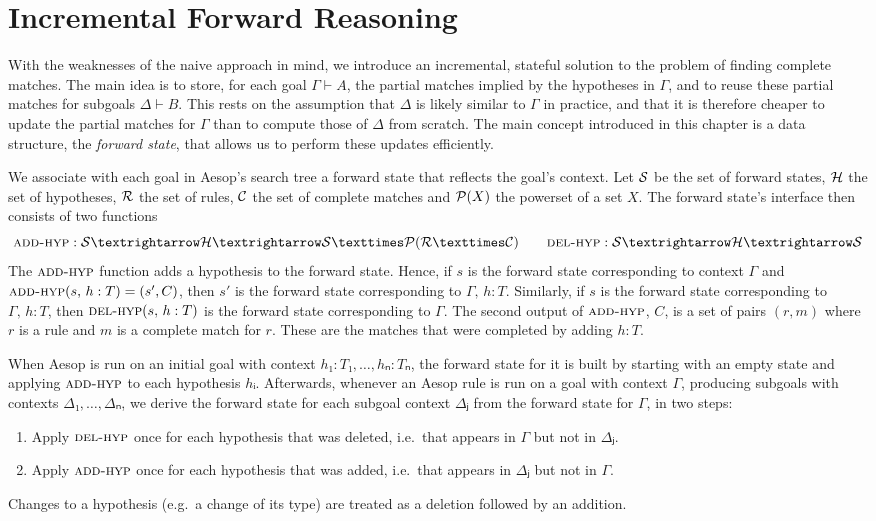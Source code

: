 \section{Incremental Forward Reasoning}%
\label{sec:forward:incremental}

With the weaknesses of the naive approach in mind, we introduce an incremental, stateful solution to the problem of finding complete matches.
The main idea is to store, for each goal $Γ ⊢ A$, the partial matches implied by the hypotheses in $Γ$, and to reuse these partial matches for subgoals $Δ ⊢ B$.
This rests on the assumption that $Δ$ is likely similar to $Γ$ in practice, and that it is therefore cheaper to update the partial matches for $Γ$ than to compute those of $Δ$ from scratch.
The main concept introduced in this chapter is a data structure, the \emph{forward state}, that allows us to perform these updates efficiently.

We associate with each goal in Aesop's search tree a forward state that reflects the goal's context.
Let $\mathcal{S}$ be the set of forward states, $\mathcal{H}$ the set of hypotheses, $\mathcal{R}$ the set of rules, $\mathcal{C}$ the set of complete matches and $\mathcal{P}(X)$ the powerset of a set $X$.
The forward state's interface then consists of two functions
\[
  \addHyp : \States → \Hyps → \States × \powerset(\Rules × \CMatches) \qquad \delHyp : \States → \Hyps → \States
\]
The $\text{\textsc{add-hyp}}$ function adds a hypothesis to the forward state.
Hence, if $s$ is the forward state corresponding to context $Γ$ and $\text{\textsc{add-hyp}}(s,\, h : T) = (s', C)$, then $s'$ is the forward state corresponding to $Γ,\, h : T$.
Similarly, if $s$ is the forward state corresponding to $Γ,\, h : T$, then $\text{\textsc{del-hyp}}(s,\, h : T)$ is the forward state corresponding to $Γ$.
The second output of $\text{\textsc{add-hyp}}$, $C$, is a set of pairs $(r, m)$ where $r$ is a rule and $m$ is a complete match for $r$.
These are the matches that were completed by adding $h : T$.

When Aesop is run on an initial goal with context $h₁ : T₁, \dots, hₙ : Tₙ$, the forward state for it is built by starting with an empty state and applying $\text{\textsc{add-hyp}}$ to each hypothesis $hᵢ$.
Afterwards, whenever an Aesop rule is run on a goal with context $Γ$, producing subgoals with contexts $Δ₁, \dots, Δₙ$, we derive the forward state for each subgoal context $Δⱼ$ from the forward state for $Γ$, in two steps:
\begin{enumerate}
  \item Apply $\text{\textsc{del-hyp}}$ once for each hypothesis that was deleted, i.e.\ that appears in $Γ$ but not in $Δⱼ$.
  \item Apply $\text{\textsc{add-hyp}}$ once for each hypothesis that was added, i.e.\ that appears in $Δⱼ$ but not in $Γ$.
\end{enumerate}
Changes to a hypothesis (e.g.\ a change of its type) are treated as a deletion followed by an addition.

